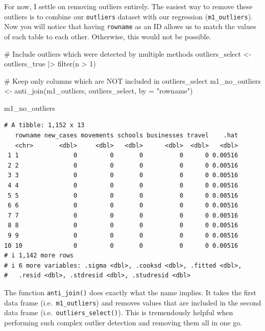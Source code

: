 \documentclass[
  letterpaper,
  DIV=11,
  numbers=noendperiod]{scrreprt}
\newenvironment{Shaded}{\begin{snugshade}}{\end{snugshade}}
\newcommand{\AttributeTok}[1]{\textcolor[rgb]{0.40,0.45,0.13}{#1}}
\newcommand{\CommentTok}[1]{\textcolor[rgb]{0.37,0.37,0.37}{#1}}
\newcommand{\DecValTok}[1]{\textcolor[rgb]{0.68,0.00,0.00}{#1}}
\newcommand{\FunctionTok}[1]{\textcolor[rgb]{0.28,0.35,0.67}{#1}}
\newcommand{\NormalTok}[1]{\textcolor[rgb]{0.00,0.23,0.31}{#1}}
\newcommand{\OtherTok}[1]{\textcolor[rgb]{0.00,0.23,0.31}{#1}}
\newcommand{\SpecialCharTok}[1]{\textcolor[rgb]{0.37,0.37,0.37}{#1}}
\newcommand{\StringTok}[1]{\textcolor[rgb]{0.13,0.47,0.30}{#1}}
\begin{document}
For now, I settle on removing outliers entirely. The easiest way to
remove these outliers is to combine our \texttt{outliers} dataset with
our regression (\texttt{m1\_outliers}). Now you will notice that having
\texttt{rowname} as an ID allows us to match the values of each table to
each other. Otherwise, this would not be possible.

\begin{Shaded}
\begin{Highlighting}[]
\CommentTok{\# Include outliers which were detected by multiple methods}
\NormalTok{outliers\_select }\OtherTok{\textless{}{-}}
\NormalTok{  outliers\_true }\SpecialCharTok{|\textgreater{}}
  \FunctionTok{filter}\NormalTok{(n }\SpecialCharTok{\textgreater{}} \DecValTok{1}\NormalTok{)}

\CommentTok{\# Keep only columns which are NOT included in outliers\_select}
\NormalTok{m1\_no\_outliers }\OtherTok{\textless{}{-}} \FunctionTok{anti\_join}\NormalTok{(m1\_outliers, outliers\_select,}
                            \AttributeTok{by =} \StringTok{"rowname"}\NormalTok{)}

\NormalTok{m1\_no\_outliers}
\end{Highlighting}
\end{Shaded}

\begin{verbatim}
# A tibble: 1,152 x 13
   rowname new_cases movements schools businesses travel    .hat
   <chr>       <dbl>     <dbl>   <dbl>      <dbl>  <dbl>   <dbl>
 1 1               0         0       0          0      0 0.00516
 2 2               0         0       0          0      0 0.00516
 3 3               0         0       0          0      0 0.00516
 4 4               0         0       0          0      0 0.00516
 5 5               0         0       0          0      0 0.00516
 6 6               0         0       0          0      0 0.00516
 7 7               0         0       0          0      0 0.00516
 8 8               0         0       0          0      0 0.00516
 9 9               0         0       0          0      0 0.00516
10 10              0         0       0          0      0 0.00516
# i 1,142 more rows
# i 6 more variables: .sigma <dbl>, .cooksd <dbl>, .fitted <dbl>,
#   .resid <dbl>, .stdresid <dbl>, .studresid <dbl>
\end{verbatim}

The function \texttt{anti\_join()} does exactly what the name implies.
It takes the first data frame (i.e.~\texttt{m1\_outliers}) and removes
values that are included in the second data frame
(i.e.~\texttt{outliers\_select()}). This is tremendously helpful when
performing such complex outlier detection and removing them all in one
go.
\end{document}
